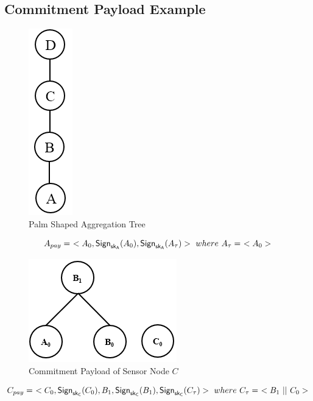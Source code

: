 \documentclass[%
  slidesonly,%
  semlayer%
  ]{seminar}                                  %
\newcommand{\sk}{\sf{sk}}
\begin{document}
\begin{slide}
    \subsection*{Commitment Payload Example}
      \begin{figure}[h!]
        \centering
        \includegraphics[scale = 0.5]{images/palm-aggregation-tree.png}
        \caption{Palm Shaped Aggregation Tree}
        \label{fig:Palm aggregation tree}
      \end{figure}

      \begin{equation}
        A_{pay} =\ <A_{0}, \textsf{Sign}_{\sk_{A}}(A_{0}), \textsf{Sign}_{\sk_{A}}(A_{\tau}) >\ where\ A_{\tau} =\ < A_{0} > 
      \end{equation}

      \begin{figure}[h!]
        \centering
        \includegraphics[scale = 0.5]{images/commitment-payload-of-C.png}
        \caption{Commitment Payload of Sensor Node $C$}
        \label{fig:Commitment payload of C}
      \end{figure}
      \begin{equation}
          C_{pay} =\ <C_{0}, \textsf{Sign}_{\sk_{C}}(C_{0}), B_{1}, \textsf{Sign}_{\sk_{C}}(B_{1}), \textsf{Sign}_{\sk_{C}}(C_{\tau}) >\ where\ C_{\tau} =\ <B_{1}\ ||\ C_{0}>
      \end{equation}
      \clearpage


\end{slide}
\end{document}
